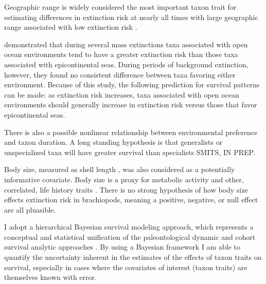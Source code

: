\documentclass[12pt,letterpaper]{article}
\begin{document}
Geographic range is widely considered the most important taxon trait for estimating differences in extinction risk at nearly all times with large geographic range associated with low extinction risk \citep{Jablonski1986,Jablonski1987,Jablonski2003,Payne2007}.

\citet{Miller2009a} demonstrated that during several mass extinctions taxa associated with open ocean environments tend to have a greater extinction risk than those taxa associated with epicontinental seas. During periods of background extinction, however, they found no consistent difference between taxa favoring either environment. Because of this study, the following prediction for survival patterns can be made: as extinction risk increases, taxa associated with open ocean environments should generally increase in extinction risk versus those that favor epicontinental seas.

There is also a possible nonlinear relationship between environmental preference and taxon duration. A long standing hypothesis is that generalists or unspecialized taxa will have greater survival than specialists \citep{Simpson1944,Liow2004a,Liow2007b,Nurnberg2013a,Nurnberg2015,Baumiller1993} \uppercase{Smits, in prep}. 

Body size, measured as shell length \citep{Payne2014}, was also considered as a potentially informative covariate. Body size is a proxy for metabolic activity and other, correlated, life history traits \citep{Payne2014}. There is no strong hypothesis of how body size effects extinction risk in brachiopods, meaning a positive, negative, or null effect are all pluasible.

I adopt a hierarchical Bayesian survival modeling approach, which represents a conceptual and statistical unification of the paleontological dynamic and cohort survival analytic approaches \citep{VanValen1973,VanValen1979,Raup1978,Raup1975,Foote1988,Baumiller1993,Simpson2006}. By using a Bayesian framework I am able to quantify the uncertainty inherent in the estimates of the effects of taxon traits on survival, especially in cases where the covariates of interest (taxon traits) are themselves known with error. 
\end{document}
